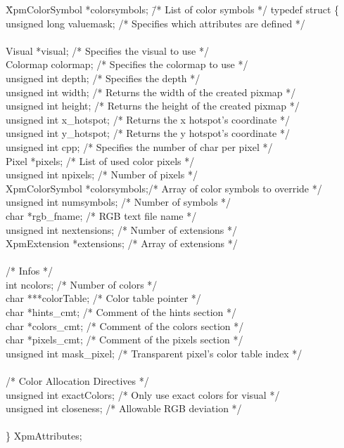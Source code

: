 {\small \begin{tabbing}

\hspace{1cm}\= XpmColorSymbol *colorsymbols; \=/* List of color symbols */\kill
typedef struct \{ \\
\> unsigned long valuemask;  \>/* Specifies which attributes are defined */\\
\\
\> Visual *visual;	     \>/* Specifies the visual to use */ \\
\> Colormap colormap; 	     \>/* Specifies the colormap to use */ \\
\> unsigned int depth;	     \>/* Specifies the depth */ \\
\> unsigned int width;	     \>/* Returns the width of the created pixmap */\\
\> unsigned int height;      \>/* Returns the height of the created pixmap */\\
\> unsigned int x\_hotspot;  \>/* Returns the x hotspot's coordinate */\\
\> unsigned int y\_hotspot;  \>/* Returns the y hotspot's coordinate */ \\
\> unsigned int cpp; 	     \>/* Specifies the number of char per pixel */ \\
\> Pixel *pixels; 	     \>/* List of used color pixels */ \\
\> unsigned int npixels;     \>/* Number of pixels */\\
\> XpmColorSymbol *colorsymbols;\>/* Array of color symbols to override */ \\
\> unsigned int numsymbols;  \>/* Number of symbols */ \\
\> char *rgb\_fname;	     \>/* RGB text file name */ \\
\> unsigned int nextensions; \>/* Number of extensions */ \\
\> XpmExtension *extensions; \>/* Array of extensions */ \\
\\
\> /* Infos */  \\
\> int ncolors;		     \>/* Number of colors */ \\
\> char ***colorTable; 	     \>/* Color table pointer */ \\
\> char *hints\_cmt; 	     \>/* Comment of the hints section */ \\
\> char *colors\_cmt;	     \>/* Comment of the colors section */ \\
\> char *pixels\_cmt;	     \>/* Comment of the pixels section */ \\
\> unsigned int mask\_pixel; \>/* Transparent pixel's color table index */\\
\\
\> /* Color Allocation Directives */ \\
\> unsigned int exactColors; \>/* Only use exact colors for visual */ \\
\> unsigned int closeness;   \>/* Allowable RGB deviation */ \\
\\
\} XpmAttributes;

\end{tabbing}}

